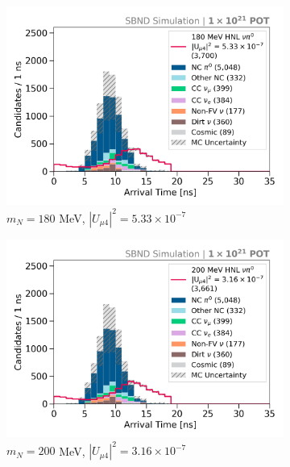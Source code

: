 \begin{figure}[hb!]
        \begin{subfigure}[b]{0.495\textwidth}
            \includegraphics[width=\textwidth]{m180}
            \caption{$m_N = 180$ MeV, $|U_{\mu4}|^2 = 5.33 \times 10^{-7}$ }
        \end{subfigure}
        \begin{subfigure}[b]{0.495\textwidth}
            \includegraphics[width=\textwidth]{m200}
            \caption{$m_N = 200$ MeV, $|U_{\mu4}|^2 = 3.16 \times 10^{-7}$ }
        \end{subfigure}
        \begin{subfigure}[b]{0.495\textwidth}

\end{subfigure}
\end{figure}
